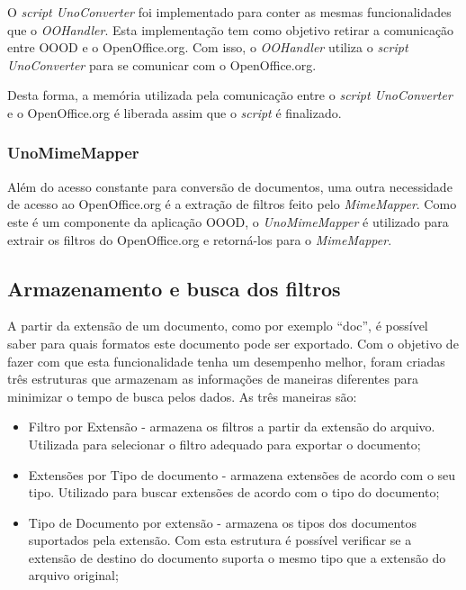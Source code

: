 O \textit{script UnoConverter} foi implementado para conter as mesmas funcionalidades que o \textit{OOHandler}. Esta implementação tem como objetivo retirar a comunicação entre OOOD e o OpenOffice.org. Com isso, o \textit{OOHandler} utiliza o \textit{script UnoConverter} para se comunicar com o OpenOffice.org.

Desta forma, a memória utilizada pela comunicação entre o \textit{script UnoConverter} e o OpenOffice.org é liberada assim que o \textit{script} é finalizado.

\subsubsection{UnoMimeMapper}

Além do acesso constante para conversão de documentos, uma outra necessidade de acesso ao OpenOffice.org é a extração de filtros feito pelo \textit{MimeMapper}. Como este é um componente da aplicação OOOD, o \textit{UnoMimeMapper} é utilizado para extrair os filtros do OpenOffice.org e retorná-los para o \textit{MimeMapper}.

\subsection{Armazenamento e busca dos filtros}

A partir da extensão de um documento, como por exemplo ``doc'', é possível saber para quais formatos este documento pode ser exportado. Com o objetivo de fazer com que esta funcionalidade tenha um desempenho melhor, foram criadas três estruturas que armazenam as informações de maneiras diferentes para minimizar o tempo de busca pelos dados. As três maneiras são:

\begin{itemize}
\item Filtro por Extensão - armazena os filtros a partir da extensão do arquivo. Utilizada para selecionar o filtro adequado para exportar o documento;

\item Extensões por Tipo de documento - armazena extensões de acordo com o seu tipo. Utilizado para buscar extensões de acordo com o tipo do documento;

\item Tipo de Documento por extensão - armazena os tipos dos documentos suportados pela extensão. Com esta estrutura é possível verificar se a extensão de destino do documento suporta o mesmo tipo que a extensão do arquivo original;
\end{itemize}

